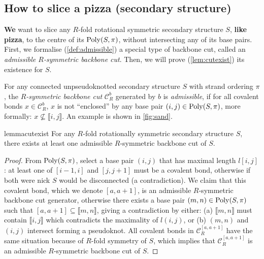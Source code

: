\subsection{How to slice a pizza (secondary structure)}

{\bf We} want to slice any $R$-fold rotational symmetric secondary structure $S$, {\bf like pizza}, to the centre of its $\mathrm{Poly}(S,\pi)$, without intersecting any of its base pairs. First, we formalise (\cref{def:admissible}) a special type of backbone cut, called an \emph{admissible  $R$-symmetric backbone cut}. Then, we will prove (\cref{lem:cutexist}) its existence for $S$. 

\begin{Definition} \label{def:admissible}
	For any connected unpseudoknotted secondary structure $S$ with strand ordering $\pi$, the {\em $R$-symmetric backbone cut} $\mathcal{C}_R^b$ generated by $b$ is {\em admissible}, 
	if for all covalent bonds $x \in \mathcal{C}_R^b$,  
	$x$ is not ``enclosed'' by any base pair $(i,j) \in \mathrm{Poly}(S,\pi)$, more formally:  $x \nsubseteq \llbracket i,j \rrbracket$.   An example is shown in \cref{fig:sand}.
\end{Definition}


\begin{restatable}{lemma}{cutexist} 
	\label{lem:cutexist}
	For any $R$-fold rotationally symmetric secondary structure $S$, there exists at least one admissible $R$-symmetric backbone cut of $S$.
\end{restatable}
\begin{proof}
	From $\mathrm{Poly}(S,\pi)$, select  a base pair $(i,j)$ that has maximal length $l[i,j]$: 
	at least one of $[i-1,i]$ and $[j,j+1]$ must be a covalent bond, otherwise if both were nick $S$ would be disconnected (a contradiction). 
	We claim that this covalent bond, which we denote $[a,a+1]$, 
	is an admissible $R$-symmetric backbone cut generator, otherwise there exists a base pair $(m,n) \in \mathrm{Poly}(S,\pi)$ such that $[a,a+1] \subseteq \llbracket m,n \rrbracket$, 
	giving a contradiction by either: 
	(a) 
	$\llbracket m,n \rrbracket$ must contain $\llbracket i,j \rrbracket$ which contradicts the maximality of $l( i,j )$, 
	or (b) $( m,n )$ and $( i,j )$ intersect forming a pseudoknot. 
	All covalent bonds in $\mathcal{C}_R^{[a,a+1]}$  have the same situation because of $R$-fold symmetry of $S$, 
	which implies that $\mathcal{C}_R^{[a,a+1]}$ is an admissible $R$-symmetric backbone cut of $S$.
\end{proof}

